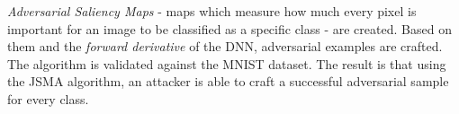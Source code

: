  \textit{Adversarial Saliency Maps} - maps which measure how much every pixel is important for an image to be classified as a specific class - are created. Based on them and the \textit{forward derivative} of the DNN, adversarial examples are crafted. The algorithm is validated against the MNIST dataset. The result is that using the JSMA algorithm, an attacker is able to craft a successful adversarial sample for every class.
